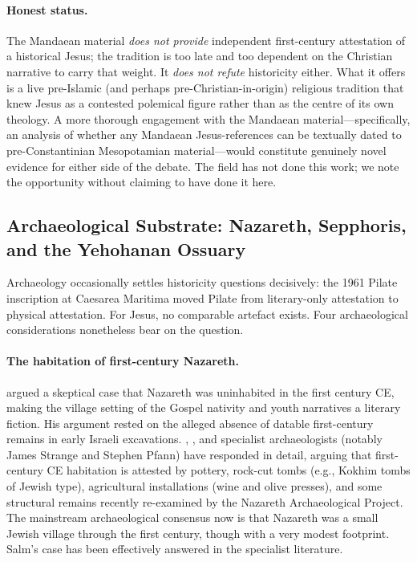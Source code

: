 \documentclass[12pt,oneside]{article}
\begin{document}
\paragraph{Honest status.}
The Mandaean material \textit{does not provide} independent
first-century attestation of a historical Jesus; the tradition is
too late and too dependent on the Christian narrative to carry that
weight.  It \textit{does not refute} historicity either.  What it
offers is a live pre-Islamic (and perhaps pre-Christian-in-origin)
religious tradition that knew Jesus as a contested polemical
figure rather than as the centre of its own theology.  A more
thorough engagement with the Mandaean material---specifically, an
analysis of whether any Mandaean Jesus-references can be textually
dated to pre-Constantinian Mesopotamian material---would constitute
genuinely novel evidence for either side of the debate.  The field
has not done this work; we note the opportunity without claiming to
have done it here.

\subsection{Archaeological Substrate: {Nazareth}, Sepphoris, and the Yehohanan Ossuary}
\label{sec:external:archaeology}

Archaeology occasionally settles historicity questions decisively:
the 1961 Pilate inscription at Caesarea Maritima \citep{Vardaman1962}
moved Pilate from literary-only attestation to physical attestation.
For Jesus, no comparable artefact exists.  Four archaeological
considerations nonetheless bear on the question.

\paragraph{The habitation of first-century {Nazareth}.}
\citet{Salm2008} argued a skeptical case that Nazareth was
uninhabited in the first century CE, making the village setting of
the Gospel nativity and youth narratives a literary fiction.  His
argument rested on the alleged absence of datable first-century
remains in early Israeli excavations.  \citet{Reed2000},
\citet{Dark2020}, and specialist archaeologists (notably James
Strange and Stephen Pfann) have responded in detail, arguing that
first-century CE habitation is attested by pottery, rock-cut tombs
(e.g., Kokhim tombs of Jewish type), agricultural installations
(wine and olive presses), and some structural remains recently
re-examined by the Nazareth Archaeological Project.  The mainstream
archaeological consensus now is that Nazareth was a small Jewish
village through the first century, though with a very modest
footprint.  Salm's case has been effectively answered in the
specialist literature.
\end{document}
